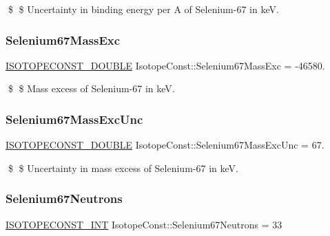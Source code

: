 \$ \$ Uncertainty in binding energy per A of Selenium-\/67 in keV. \mbox{\label{group___isotope_const-_selenium-_se67_ga05c65ec2e6efe8e7b7b1c64cf362316b}} 
\subsubsection{\texorpdfstring{Selenium67\+Mass\+Exc}{Selenium67MassExc}}
{\footnotesize\ttfamily \mbox{\hyperlink{group___isotope_const-_macros_ga8f45a7272ce02c0b4c65c44636ed719a}{I\+S\+O\+T\+O\+P\+E\+C\+O\+N\+S\+T\+\_\+\+D\+O\+U\+B\+LE}} Isotope\+Const\+::\+Selenium67\+Mass\+Exc = -\/46580.}

\$ \$ Mass excess of Selenium-\/67 in keV. \mbox{\label{group___isotope_const-_selenium-_se67_gaf8b3a6821f7ddc0287fedb4701572d49}} 
\subsubsection{\texorpdfstring{Selenium67\+Mass\+Exc\+Unc}{Selenium67MassExcUnc}}
{\footnotesize\ttfamily \mbox{\hyperlink{group___isotope_const-_macros_ga8f45a7272ce02c0b4c65c44636ed719a}{I\+S\+O\+T\+O\+P\+E\+C\+O\+N\+S\+T\+\_\+\+D\+O\+U\+B\+LE}} Isotope\+Const\+::\+Selenium67\+Mass\+Exc\+Unc = 67.}

\$ \$ Uncertainty in mass excess of Selenium-\/67 in keV. \mbox{\label{group___isotope_const-_selenium-_se67_ga02842b2473da216649bb78f03e517536}} 
\subsubsection{\texorpdfstring{Selenium67\+Neutrons}{Selenium67Neutrons}}
{\footnotesize\ttfamily \mbox{\hyperlink{group___isotope_const-_macros_ga5f18360b3e99483a35c32d789e62621c}{I\+S\+O\+T\+O\+P\+E\+C\+O\+N\+S\+T\+\_\+\+I\+NT}} Isotope\+Const\+::\+Selenium67\+Neutrons = 33}

